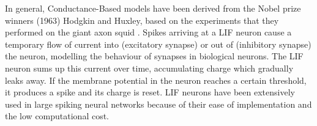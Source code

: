In general, Conductance-Based models have been derived from the Nobel prize winners (1963) Hodgkin and Huxley, based on the experiments that they performed on the giant axon squid \cite{hhmodel}.
Spikes arriving at a LIF neuron cause a temporary flow of current into (excitatory synapse) or out of (inhibitory synapse) the neuron, modelling the behaviour of synapses in biological neurons.
The LIF neuron sums up this current over time, accumulating charge which gradually leaks away.
If the membrane potential in the neuron reaches a certain threshold, it produces a spike and its charge is reset.
LIF neurons have been extensively used in large spiking neural networks \cite{Delorme1999989} because of their ease of implementation and the low computational cost.
%
%
% 
%
